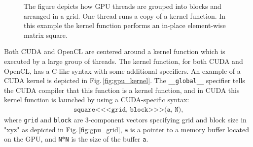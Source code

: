 \begin{figure}
\centering
{}
\caption{The figure depicts how GPU threads are grouped into blocks and arranged in a grid. One thread runs a copy of a kernel function. In this example the kernel function performs an in-place element-wise matrix square.}
\label{fig:gpu_grid_kernel}
\end{figure}

Both CUDA and OpenCL are centered around a kernel function which is executed by a large group of threads. The kernel function, for both CUDA and OpenCL, has a C-like syntax with some additional specifiers. An example of a CUDA kernel is depicted in Fig.\,\ref{fig:gpu_kernel}. The \texttt{\_\_global\_\_} specifier tells the CUDA compiler that this function is a kernel function, and in CUDA this kernel function is launched by using a CUDA-specific syntax:
\begin{align*}
\texttt{square<<<grid, block>>>(a, N)},
\end{align*}
where \texttt{grid} and \texttt{block} are 3-component vectors specifying grid and block size in "xyz" as depicted in Fig.\,\ref{fig:gpu_grid}, \texttt{a} is a pointer to a memory buffer located on the GPU, and \texttt{N}$*$\texttt{N} is the size of the buffer \texttt{a}. 


